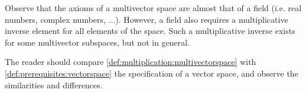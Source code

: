 Observe that the axioms of a multivector space are almost that of a field (i.e. real numbers, complex numbers, ...).
However,
a field also requires a multiplicative inverse element for all elements of the space.
Such a multiplicative inverse exists for some multivector subspaces, but not in general.

The reader should compare \cref{def:multiplication:multivectorspace} with
\cref{def:prerequisites:vectorspace} the specification of a vector space, and observe the similarities and differences.

%

